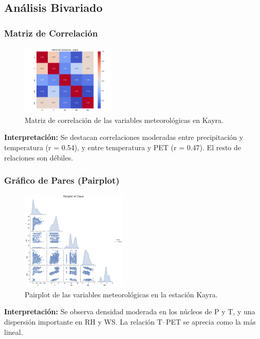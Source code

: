 \subsection{Análisis Bivariado}

\subsubsection*{Matriz de Correlación}
\begin{figure}[H]
\centering
\includegraphics[width=0.4\textwidth]{resultados/por_estacion_meteorologica/Kayra/matriz_correlacion.png}
\caption{Matriz de correlación de las variables meteorológicas en Kayra.}
\label{fig:kayra_corr}
\end{figure}
\textbf{Interpretación:} Se destacan correlaciones moderadas entre precipitación y temperatura (r = 0.54), y entre temperatura y PET (r = 0.47). El resto de relaciones son débiles.

\subsubsection*{Gráfico de Pares (Pairplot)}
\begin{figure}[H]
\centering
\includegraphics[width=0.45\textwidth]{resultados/por_estacion_meteorologica/Kayra/pairplot.png}
\caption{Pairplot de las variables meteorológicas en la estación Kayra.}
\label{fig:kayra_pairplot}
\end{figure}
\textbf{Interpretación:} Se observa densidad moderada en los núcleos de P y T, y una dispersión importante en RH y WS. La relación T–PET se aprecia como la más lineal.



